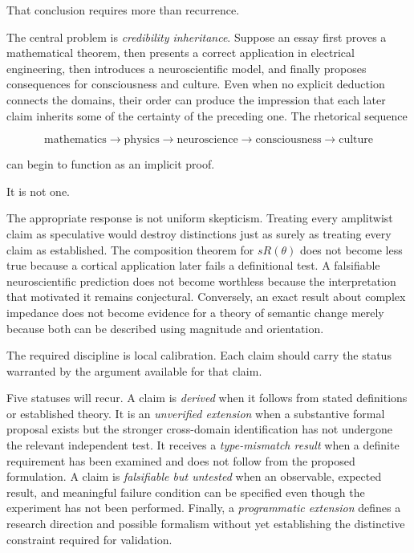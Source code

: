 \documentclass[11pt]{article}
\begin{document}
That conclusion requires more than recurrence.

The central problem is \emph{credibility inheritance}. Suppose an essay first proves a mathematical theorem, then presents a correct application in electrical engineering, then introduces a neuroscientific model, and finally proposes consequences for consciousness and culture. Even when no explicit deduction connects the domains, their order can produce the impression that each later claim inherits some of the certainty of the preceding one. The rhetorical sequence

\begin{equation}
\text{mathematics}
\to
\text{physics}
\to
\text{neuroscience}
\to
\text{consciousness}
\to
\text{culture}
\end{equation}

can begin to function as an implicit proof.

It is not one.

The appropriate response is not uniform skepticism. Treating every amplitwist claim as speculative would destroy distinctions just as surely as treating every claim as established. The composition theorem for $sR(\theta)$ does not become less true because a cortical application later fails a definitional test. A falsifiable neuroscientific prediction does not become worthless because the interpretation that motivated it remains conjectural. Conversely, an exact result about complex impedance does not become evidence for a theory of semantic change merely because both can be described using magnitude and orientation.

The required discipline is local calibration. Each claim should carry the status warranted by the argument available for that claim.

Five statuses will recur. A claim is \emph{derived} when it follows from stated definitions or established theory. It is an \emph{unverified extension} when a substantive formal proposal exists but the stronger cross-domain identification has not undergone the relevant independent test. It receives a \emph{type-mismatch result} when a definite requirement has been examined and does not follow from the proposed formulation. A claim is \emph{falsifiable but untested} when an observable, expected result, and meaningful failure condition can be specified even though the experiment has not been performed. Finally, a \emph{programmatic extension} defines a research direction and possible formalism without yet establishing the distinctive constraint required for validation.
\end{document}
